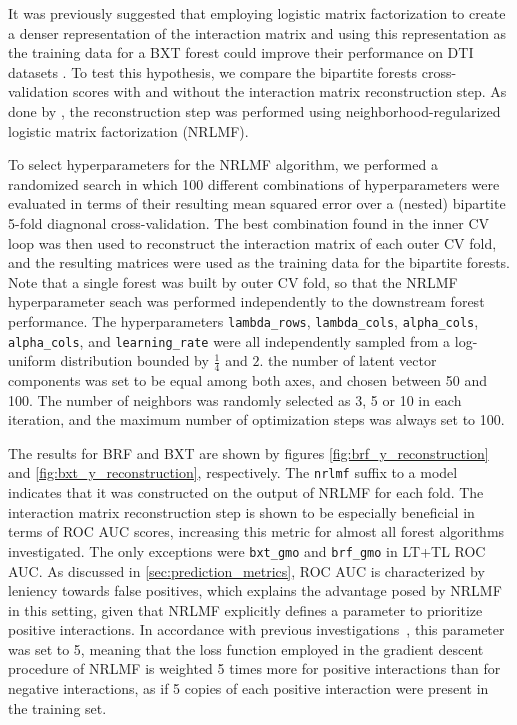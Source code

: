 It was previously suggested that employing logistic matrix factorization to create a denser representation of the interaction matrix and using this representation as the training data for a BXT forest could improve their performance on DTI datasets \cite{Pliakos_2020}. To test this hypothesis, we compare the bipartite forests cross-validation scores with and without the interaction matrix reconstruction step. As done by \cite{Pliakos_2020}, the reconstruction step was performed using neighborhood-regularized logistic matrix factorization (NRLMF)\cite{}.

To select hyperparameters for the NRLMF algorithm, we performed a randomized search in which 100 different combinations of hyperparameters were evaluated in terms of their resulting mean squared error over a (nested) bipartite 5-fold diagnonal cross-validation. The best combination found in the inner CV loop was then used to reconstruct the interaction matrix of each outer CV fold, and the resulting matrices were used as the training data for the bipartite forests. Note that a single forest was built by outer CV fold, so that the NRLMF hyperparameter seach was performed independently to the downstream forest performance. The hyperparameters \texttt{lambda\_rows}, \texttt{lambda\_cols}, \texttt{alpha\_cols}, \texttt{alpha\_cols}, and \texttt{learning\_rate} were all independently sampled from a log-uniform distribution bounded by $\frac{1}{4}$ and $2$. the number of latent vector components was set to be equal among both axes, and chosen between 50 and 100. The number of neighbors was randomly selected as 3, 5 or 10 in each iteration, and the maximum number of optimization steps was always set to 100.  %

The results for BRF and BXT are shown by figures \ref{fig:brf_y_reconstruction} and \ref{fig:bxt_y_reconstruction}, respectively. The \texttt{nrlmf} suffix to a model indicates that it was constructed on the output of NRLMF for each fold. The interaction matrix reconstruction step is shown to be especially beneficial in terms of ROC AUC scores, increasing this metric for almost all forest algorithms investigated. The only exceptions were \texttt{bxt\_gmo} and \texttt{brf\_gmo} in LT+TL ROC AUC. As discussed in \autoref{sec:prediction_metrics}, ROC AUC is characterized by leniency towards false positives, which explains the advantage posed by NRLMF in this setting, given that NRLMF explicitly defines a parameter to prioritize positive interactions. In accordance with previous investigations~\cite{liu2016neighborhood,liu2017lpinrlmf,liu2020predicting,pliakos2020drugtarget}, this parameter was set to 5, meaning that the loss function employed in the gradient descent procedure of NRLMF is weighted 5 times more for positive interactions than for negative interactions, as if 5 copies of each positive interaction were present in the training set.

